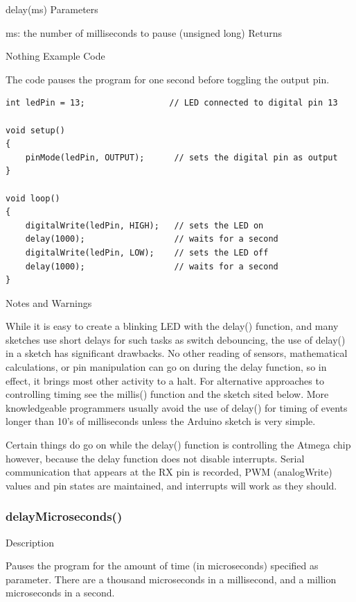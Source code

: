 \documentclass[12pt,a4paper]{report}  %
\begin{document}
delay(ms)
Parameters

ms: the number of milliseconds to pause (unsigned long)
Returns

Nothing
Example Code

The code pauses the program for one second before toggling the output pin.

\begin{lstlisting}[label=digitalwrite,caption=delay]
int ledPin = 13;                 // LED connected to digital pin 13

void setup()
{
	pinMode(ledPin, OUTPUT);      // sets the digital pin as output
}

void loop()
{
	digitalWrite(ledPin, HIGH);   // sets the LED on
	delay(1000);                  // waits for a second
	digitalWrite(ledPin, LOW);    // sets the LED off
	delay(1000);                  // waits for a second
}
\end{lstlisting}

Notes and Warnings

While it is easy to create a blinking LED with the delay() function, and many sketches use short delays for such tasks as switch debouncing, the use of delay() in a sketch has significant drawbacks. No other reading of sensors, mathematical calculations, or pin manipulation can go on during the delay function, so in effect, it brings most other activity to a halt. For alternative approaches to controlling timing see the millis() function and the sketch sited below. More knowledgeable programmers usually avoid the use of delay() for timing of events longer than 10’s of milliseconds unless the Arduino sketch is very simple.

Certain things do go on while the delay() function is controlling the Atmega chip however, because the delay function does not disable interrupts. Serial communication that appears at the RX pin is recorded, PWM (analogWrite) values and pin states are maintained, and interrupts will work as they should.


\subsubsection{delayMicroseconds()}\label{delayMicroseconds}

Description

Pauses the program for the amount of time (in microseconds) specified as parameter. There are a thousand microseconds in a millisecond, and a million microseconds in a second.
\end{document}
